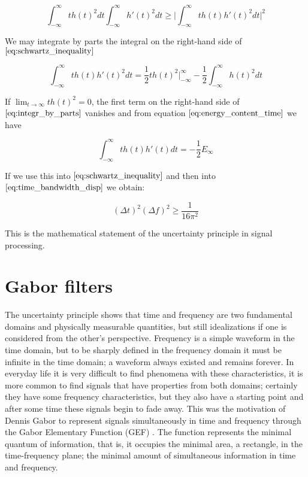 \begin{equation}\label{eq:schwartz_inequality}
    \int_{-\infty}^{\infty}t h(t)^2 dt \int_{-\infty}^{\infty}h'(t)^2 dt  \geq \biggr\rvert \int_{-\infty}^{\infty}t h(t)h'(t)^2 dt \biggr\rvert^{2}
\end{equation}

We may integrate by parts the integral on the right-hand side of $\eqref{eq:schwartz_inequality}$

\begin{equation}\label{eq:integr_by_parts}
    \int_{-\infty}^{\infty}t h(t) h'(t)^2 dt =  \frac{1}{2}t h(t)^2 \biggr\rvert_{-\infty}^{\infty} - \frac{1}{2} \int_{-\infty}^{\infty}h(t)^2 dt
\end{equation}

If $\lim_{t\rightarrow \infty} t h(t)^2=0$, the first term on the right-hand side of $\eqref{eq:integr_by_parts}$ vanishes and from equation $\eqref{eq:energy_content_time}$ we have

\begin{equation}\label{eq:energy_content_developped}
    \int_{-\infty}^{\infty} t h(t)h'(t) dt = -\frac{1}{2} E_{\infty}
\end{equation}

If we use this into $\eqref{eq:schwartz_inequality}$ and then into $\eqref{eq:time_bandwidth_disp}$ we obtain:

\begin{equation}\label{eq:uncertainty_principle_freq_square}
   (\Delta t)^2(\Delta f)^2 \geq \frac{1}{16\pi^{2}} 
\end{equation}

This is the mathematical statement of the uncertainty principle in signal processing.

\section{Gabor filters}

The uncertainty principle shows that time and frequency are two fundamental domains and physically measurable quantities, but still idealizations if one is considered from the other's perspective.
Frequency is a simple waveform in the time domain, but to be sharply defined in the frequency domain it must be infinite in the time domain; a waveform always existed and remains forever. In everyday life it is very difficult to find phenomena with these characteristics, it is more common to find signals that have properties from both domains; certainly they have some frequency characteristics, but they also have a starting point and after some time these signals begin to fade away. This was the motivation of Dennis Gabor to represent signals simultaneously in time and frequency through the Gabor Elementary Function (GEF) \cite{Gabor:JIEE:1946a}. The function represents the minimal quantum of information, that is, it occupies the minimal area, a rectangle, in the time-frequency plane; the minimal amount of simultaneous information in time and frequency.  

